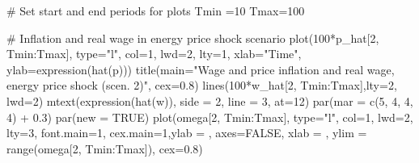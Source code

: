 \documentclass[
  letterpaper,
  DIV=11,
  numbers=noendperiod]{scrreprt}
\newenvironment{Shaded}{\begin{snugshade}}{\end{snugshade}}
\newcommand{\AttributeTok}[1]{\textcolor[rgb]{0.40,0.45,0.13}{#1}}
\newcommand{\CommentTok}[1]{\textcolor[rgb]{0.37,0.37,0.37}{#1}}
\newcommand{\ConstantTok}[1]{\textcolor[rgb]{0.56,0.35,0.01}{#1}}
\newcommand{\DecValTok}[1]{\textcolor[rgb]{0.68,0.00,0.00}{#1}}
\newcommand{\FloatTok}[1]{\textcolor[rgb]{0.68,0.00,0.00}{#1}}
\newcommand{\FunctionTok}[1]{\textcolor[rgb]{0.28,0.35,0.67}{#1}}
\newcommand{\NormalTok}[1]{\textcolor[rgb]{0.00,0.23,0.31}{#1}}
\newcommand{\OtherTok}[1]{\textcolor[rgb]{0.00,0.23,0.31}{#1}}
\newcommand{\SpecialCharTok}[1]{\textcolor[rgb]{0.37,0.37,0.37}{#1}}
\newcommand{\StringTok}[1]{\textcolor[rgb]{0.13,0.47,0.30}{#1}}
\begin{document}
\begin{Shaded}
\begin{Highlighting}[]
\CommentTok{\# Set start and end periods for plots}
\NormalTok{Tmin }\OtherTok{=}\DecValTok{10}
\NormalTok{Tmax}\OtherTok{=}\DecValTok{100}

\CommentTok{\# Inflation and real wage in energy price shock scenario}
\FunctionTok{plot}\NormalTok{(}\DecValTok{100}\SpecialCharTok{*}\NormalTok{p\_hat[}\DecValTok{2}\NormalTok{, Tmin}\SpecialCharTok{:}\NormalTok{Tmax], }\AttributeTok{type=}\StringTok{"l"}\NormalTok{, }\AttributeTok{col=}\DecValTok{1}\NormalTok{, }\AttributeTok{lwd=}\DecValTok{2}\NormalTok{, }\AttributeTok{lty=}\DecValTok{1}\NormalTok{, }\AttributeTok{xlab=}\StringTok{"Time"}\NormalTok{, }\AttributeTok{ylab=}\FunctionTok{expression}\NormalTok{(}\FunctionTok{hat}\NormalTok{(p))) }
\FunctionTok{title}\NormalTok{(}\AttributeTok{main=}\StringTok{"Wage and price inflation and real wage, energy price shock (scen. 2)"}\NormalTok{, }\AttributeTok{cex=}\FloatTok{0.8}\NormalTok{)}
\FunctionTok{lines}\NormalTok{(}\DecValTok{100}\SpecialCharTok{*}\NormalTok{w\_hat[}\DecValTok{2}\NormalTok{, Tmin}\SpecialCharTok{:}\NormalTok{Tmax],}\AttributeTok{lty=}\DecValTok{2}\NormalTok{, }\AttributeTok{lwd=}\DecValTok{2}\NormalTok{)}
\FunctionTok{mtext}\NormalTok{(}\FunctionTok{expression}\NormalTok{(}\FunctionTok{hat}\NormalTok{(w)), }\AttributeTok{side =} \DecValTok{2}\NormalTok{, }\AttributeTok{line =} \DecValTok{3}\NormalTok{, }\AttributeTok{at=}\DecValTok{12}\NormalTok{)}
\FunctionTok{par}\NormalTok{(}\AttributeTok{mar =} \FunctionTok{c}\NormalTok{(}\DecValTok{5}\NormalTok{, }\DecValTok{4}\NormalTok{, }\DecValTok{4}\NormalTok{, }\DecValTok{4}\NormalTok{) }\SpecialCharTok{+} \FloatTok{0.3}\NormalTok{)}
\FunctionTok{par}\NormalTok{(}\AttributeTok{new =} \ConstantTok{TRUE}\NormalTok{)}
\FunctionTok{plot}\NormalTok{(omega[}\DecValTok{2}\NormalTok{, Tmin}\SpecialCharTok{:}\NormalTok{Tmax], }\AttributeTok{type=}\StringTok{"l"}\NormalTok{, }\AttributeTok{col=}\DecValTok{1}\NormalTok{, }\AttributeTok{lwd=}\DecValTok{2}\NormalTok{, }\AttributeTok{lty=}\DecValTok{3}\NormalTok{, }\AttributeTok{font.main=}\DecValTok{1}\NormalTok{, }\AttributeTok{cex.main=}\DecValTok{1}\NormalTok{,}\AttributeTok{ylab =} \StringTok{\textquotesingle{}\textquotesingle{}}\NormalTok{, }\AttributeTok{axes=}\ConstantTok{FALSE}\NormalTok{,}
     \AttributeTok{xlab =} \StringTok{\textquotesingle{}\textquotesingle{}}\NormalTok{, }\AttributeTok{ylim =} \FunctionTok{range}\NormalTok{(omega[}\DecValTok{2}\NormalTok{, Tmin}\SpecialCharTok{:}\NormalTok{Tmax]), }\AttributeTok{cex=}\FloatTok{0.8}\NormalTok{)}

\end{Highlighting}
\end{Shaded}
\end{document}
